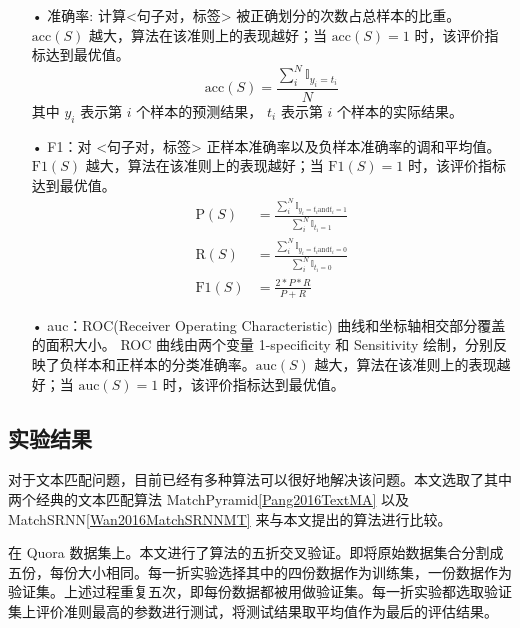 \begin{itemize}
  \item[•] 准确率: 计算<句子对，标签> 被正确划分的次数占总样本的比重。 $\text{acc}(S)$ 越大，算法在该准则上的表现越好；当 $\text{acc}(S) = 1$ 时，该评价指标达到最优值。
  $$
  \text{acc}(S) = \frac{\sum_i^N\mathbb{I}_{y_i=t_i}}{N}
  $$
  其中 $y_i$ 表示第 $i$ 个样本的预测结果， $t_i$ 表示第 $i$ 个样本的实际结果。
  \item[•] F1：对 <句子对，标签> 正样本准确率以及负样本准确率的调和平均值。 $\text{F1}(S)$ 越大，算法在该准则上的表现越好；当 $\text{F1}(S) = 1$ 时，该评价指标达到最优值。
  $$
  \begin{aligned}
  \text{P}(S) &= \frac{\sum_i^N\mathbb{I}_{y_i=t_i \text{and} t_i = 1}}{\sum_i^N\mathbb{I}_{t_i = 1}}\\
  \text{R}(S) &= \frac{\sum_i^N\mathbb{I}_{y_i=t_i \text{and} t_i = 0}}{\sum_i^N\mathbb{I}_{t_i = 0}}\\
  \text{F1}(S) &= \frac{2*P*R}{P+R}
  \end{aligned}
  $$
  \item[•] auc：ROC(Receiver Operating Characteristic) 曲线和坐标轴相交部分覆盖的面积大小。 ROC 曲线由两个变量 1-specificity 和 Sensitivity 绘制，分别反映了负样本和正样本的分类准确率。$\text{auc}(S)$ 越大，算法在该准则上的表现越好；当 $\text{auc}(S) = 1$ 时，该评价指标达到最优值。
\end{itemize}

\subsection{实验结果}
\label{sec:lab_value}
对于文本匹配问题，目前已经有多种算法可以很好地解决该问题。本文选取了其中两个经典的文本匹配算法 MatchPyramid\ref{Pang2016TextMA} 以及 MatchSRNN\ref{Wan2016MatchSRNNMT} 来与本文提出的算法进行比较。

在 Quora 数据集上。本文进行了算法的五折交叉验证。即将原始数据集合分割成五份，每份大小相同。每一折实验选择其中的四份数据作为训练集，一份数据作为验证集。上述过程重复五次，即每份数据都被用做验证集。每一折实验都选取验证集上评价准则最高的参数进行测试，将测试结果取平均值作为最后的评估结果。

